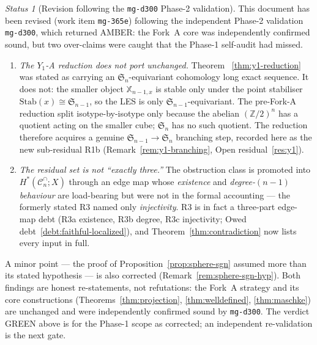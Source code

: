 \documentclass[11pt,oneside]{amsart}
\theoremstyle{plain}
\theoremstyle{definition}
\theoremstyle{remark}
\theoremstyle{honeststyle}
\newtheorem{status}[theorem]{Status}
\newcommand{\Sym}{\mathfrak{S}}
\newcommand{\Z}{\mathbb{Z}}
\newcommand{\Cn}{\mathcal{C}^{\cap}_n}
\newcommand{\Xbb}{\mathbb{X}}
\begin{document}
\begin{status}[Revision following the \texttt{mg-d300} Phase-2 validation]
\label{status:mg365e-revision}
This document has been revised (work item \texttt{mg-365e}) following
the independent Phase-2 validation \texttt{mg-d300}, which returned
\textsf{AMBER}: the Fork~A core was independently confirmed sound, but
two over-claims were caught that the Phase-1 self-audit had missed.
\begin{enumerate}[label=\textup{(\Alph*)},leftmargin=2.4em]
\item \emph{The $Y_1$-A reduction does not port unchanged.} Theorem~%
  \ref{thm:y1-reduction} was stated as carrying an
  $\Sym_n$-equivariant cohomology long exact sequence. It does not:
  the smaller object $\Xbb_{n-1,x}$ is stable only under the point
  stabiliser $\mathrm{Stab}(x)\cong\Sym_{n-1}$, so the LES is only
  $\Sym_{n-1}$-equivariant. The pre-Fork-A reduction split
  isotype-by-isotype only because the abelian $(\Z/2)^n$ has a
  quotient acting on the smaller cube; $\Sym_n$ has no such quotient.
  The reduction therefore acquires a genuine $\Sym_{n-1}\to\Sym_n$
  branching step, recorded here as the new sub-residual R1b
  (Remark~\ref{rem:y1-branching}, Open residual~\ref{res:y1}).
\item \emph{The residual set is not ``exactly three.''} The
  obstruction class is promoted into $H^{*}(\Cn;X)$ through an edge
  map whose \emph{existence} and \emph{degree-$(n-1)$ behaviour} are
  load-bearing but were not in the formal accounting --- the formerly
  stated R3 named only \emph{injectivity}. R3 is in fact a three-part
  edge-map debt (R3a existence, R3b degree, R3c injectivity; Owed
  debt~\ref{debt:faithful-localized}), and
  Theorem~\ref{thm:contradiction} now lists every input in full.
\end{enumerate}
A minor point --- the proof of Proposition~\ref{prop:sphere-sgn}
assumed more than its stated hypothesis --- is also corrected
(Remark~\ref{rem:sphere-sgn-hyp}). Both findings are honest
re-statements, not refutations: the Fork~A strategy and its core
constructions (Theorems~\ref{thm:projection},
\ref{thm:welldefined}, \ref{thm:maschke}) are unchanged and were
independently confirmed sound by \texttt{mg-d300}. The verdict GREEN
above is for the Phase-1 scope as corrected; an independent
re-validation is the next gate.
\end{status}
\end{document}
